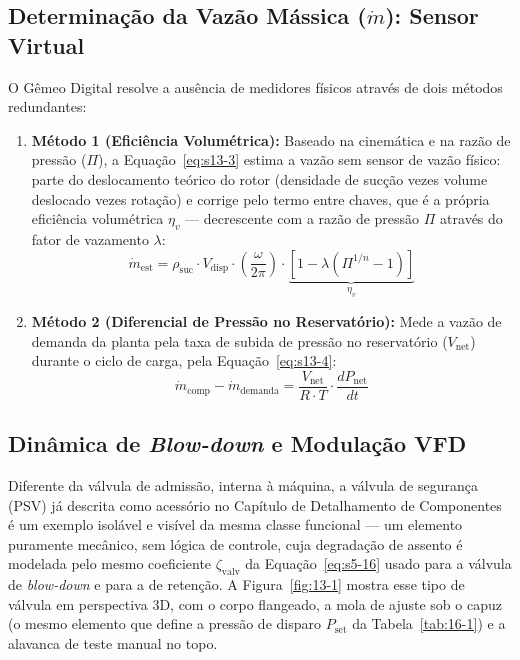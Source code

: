 \documentclass[12pt,a4paper]{article}
\numberwithin{equation}{section}
\numberwithin{table}{section}
\numberwithin{figure}{section}
\begin{document}
	\subsection{\textbf{Determinação da Vazão Mássica (\texorpdfstring{$\dot{m}$}{ṁ}): Sensor Virtual}}
	O Gêmeo Digital resolve a ausência de medidores físicos através de dois métodos redundantes:
	\begin{enumerate}
		\item \textbf{Método 1 (Eficiência Volumétrica):} Baseado na cinemática e na razão de pressão ($\Pi$), a Equação~\eqref{eq:s13-3} estima a vazão sem sensor de vazão físico: parte do deslocamento teórico do rotor (densidade de sucção vezes volume deslocado vezes rotação) e corrige pelo termo entre chaves, que é a própria eficiência volumétrica $\eta_v$ — decrescente com a razão de pressão $\Pi$ através do fator de vazamento $\lambda$:
		\begin{equation}\label{eq:s13-3}
 \dot{m}_{\text{est}} = \rho_{\text{suc}} \cdotp V_{\text{disp}} \cdotp \left( \frac{\omega}{2\pi} \right) \cdotp \underbrace{[1 - \lambda (\Pi^{1/n} - 1)]}_{\eta_v}
\end{equation}
		\item \textbf{Método 2 (Diferencial de Pressão no Reservatório):} Mede a vazão de demanda da planta pela taxa de subida de pressão no reservatório ($V_{\text{net}}$) durante o ciclo de carga, pela Equação~\eqref{eq:s13-4}:
		\begin{equation}\label{eq:s13-4}
 \dot{m}_{\text{comp}} - \dot{m}_{\text{demanda}} = \frac{V_{\text{net}}}{R \cdotp T} \cdotp \frac{dP_{\text{net}}}{dt} 
\end{equation}
	\end{enumerate}
	
	\subsection{\textbf{Dinâmica de \textit{Blow-down} e Modulação VFD}}
	Diferente da válvula de admissão, interna à máquina, a válvula de segurança (PSV) já descrita como acessório no Capítulo de Detalhamento de Componentes é um exemplo isolável e visível da mesma classe funcional — um elemento puramente mecânico, sem lógica de controle, cuja degradação de assento é modelada pelo mesmo coeficiente $\zeta_{\text{valv}}$ da Equação~\eqref{eq:s5-16} usado para a válvula de \textit{blow-down} e para a de retenção. A Figura~\ref{fig:13-1} mostra esse tipo de válvula em perspectiva 3D, com o corpo flangeado, a mola de ajuste sob o capuz (o mesmo elemento que define a pressão de disparo $P_{\text{set}}$ da Tabela~\ref{tab:16-1}) e a alavanca de teste manual no topo.
\end{document}
